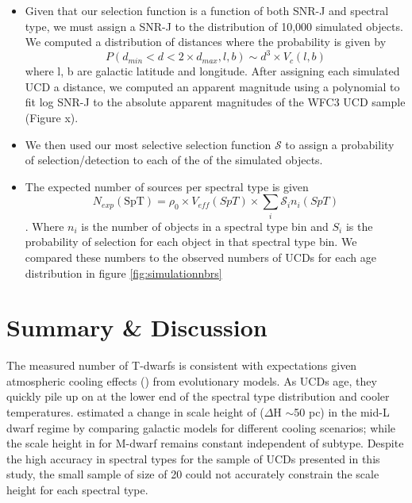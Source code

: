 \documentclass[manuscript]{aastex}
\begin{document}
\begin{itemize}
\item Given that our selection function is a function of both SNR-J and spectral type, we must assign a SNR-J to the distribution of 10,000 simulated objects.  We computed a distribution of distances where the probability is given by \begin{equation} \label{eq:distancerandom} P(d_{min} < d < 2\times d_{max}, l, b) \sim d^3 \times V_c(l, b) \end{equation} where l, b are galactic latitude and longitude. After assigning each simulated UCD a distance, we computed an apparent magnitude using a  polynomial to fit log SNR-J to the absolute apparent magnitudes of the WFC3 UCD sample (Figure x).

\item  We then used our most selective selection function $\mathcal{S}$ to assign a probability of selection/detection to each of the of the simulated objects.

\item  The expected number of sources per spectral type is given
\begin{equation}
N_{exp}(\text{SpT})=\rho_0 \times V_{eff} (SpT) \times \sum_{i} \mathcal{S}_i n_i (SpT)
\end{equation}. Where $n_i$ is the number of objects in a spectral type bin and $S_i$ is the probability of selection for each object in that spectral type bin. We compared these numbers to the observed numbers of UCDs for each age distribution in figure \ref{fig:simulationnbrs}

\end{itemize}
\section{Summary \& Discussion}

The measured number of T-dwarfs is consistent with expectations given atmospheric cooling effects (\citealt{2004ApJS..155..191B}) from evolutionary models. As UCDs age, they quickly pile up on at the lower end of the spectral type distribution and cooler temperatures. \cite{Ryan2017} estimated a change in scale height of ($\Delta$H $\sim$50 pc) in the mid-L dwarf regime by comparing galactic models for different cooling scenarios; while the scale height in for M-dwarf remains constant independent of subtype. Despite the high accuracy in spectral types for the sample of UCDs presented in this study, the small sample of size of 20 could not accurately constrain the scale height for each spectral type.
\end{document}
